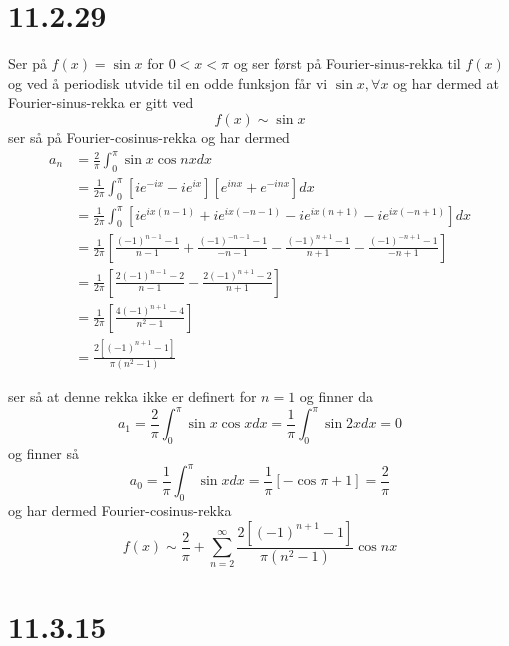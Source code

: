 \documentclass{report}
\newcommand{\nbrack}[1]{\left( #1 \right)}
\newcommand{\bbrack}[1]{\left[ #1 \right]}
\begin{document}
\section*{11.2.29}
Ser på $f(x) = \sin x$ for $0 < x < \pi$ og ser først på Fourier-sinus-rekka til $f(x)$ og ved å periodisk utvide til en odde funksjon får vi $\sin x, \forall x$ og har dermed at Fourier-sinus-rekka er gitt ved
\begin{equation}
  \label{eq:13}
  f(x) \sim \sin x
\end{equation}
ser så på Fourier-cosinus-rekka og har dermed
\begin{equation}
  \label{eq:22}
  \begin{split}
    a_{n} &= \frac{2}{\pi} \int_{0}^{\pi} \sin x \cos nx dx \\
          &= \frac{1}{2\pi} \int_{0}^{\pi} \bbrack{ ie^{-ix} - ie^{ix} } \bbrack{ e^{inx} + e^{-inx} }dx \\
          &= \frac{1}{2\pi} \int_{0}^{\pi} \bbrack{ ie^{ix(n-1)} + ie^{ix(-n-1)} - ie^{ix(n+1)} - ie^{ix(-n+1)} }dx \\
          &= \frac{1}{2\pi} \bbrack{ \frac{(-1)^{n-1} - 1}{n-1} + \frac{(-1)^{-n-1} - 1}{-n-1} - \frac{(-1)^{n+1} - 1}{n+1} - \frac{(-1)^{-n+1} - 1}{-n+1} } \\
          &= \frac{1}{2\pi} \bbrack{ \frac{2(-1)^{n-1} - 2}{n-1} - \frac{2(-1)^{n+1} - 2}{n+1} } \\
          &= \frac{1}{2\pi} \bbrack{ \frac{ 4(-1)^{n+1} - 4 }{n^{2} - 1} } \\
          &= \frac{2\bbrack{ (-1)^{n+1} - 1 }}{\pi \nbrack{ n^{2} - 1 }}
  \end{split}
\end{equation}

ser så at denne rekka ikke er definert for $n=1$ og finner da
\begin{equation}
  \label{eq:23}
  a_{1} = \frac{2}{\pi} \int_{0}^{\pi} \sin x \cos x dx = \frac{1}{\pi} \int_{0}^{\pi} \sin 2x dx = 0
\end{equation}
og finner så
\begin{equation}
  \label{eq:24}
  a_{0} = \frac{1}{\pi} \int_{0}^{\pi} \sin x dx = \frac{1}{\pi} \bbrack{ -\cos \pi + 1 } = \frac{2}{\pi}
\end{equation}
og har dermed Fourier-cosinus-rekka
\begin{equation}
  \label{eq:25}
  f(x) \sim \frac{2}{\pi} + \sum_{n=2}^{\infty} \frac{2\bbrack{ (-1)^{n+1} - 1 }}{\pi \nbrack{ n^{2} - 1 }} \cos nx
\end{equation}



\section*{11.3.15}
\end{document}
